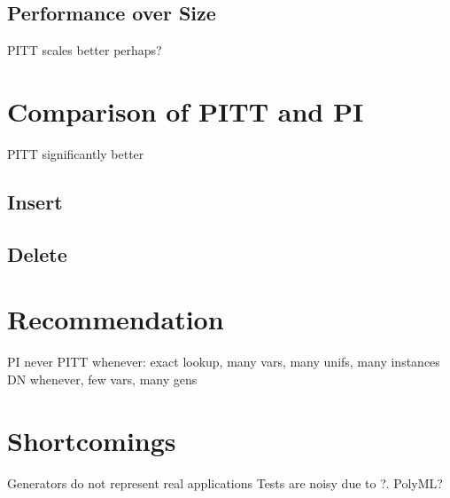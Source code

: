 \subsection{Performance over Size}
PITT scales better perhaps?

\section{Comparison of PITT and PI}
PITT significantly better
\subsection{Insert}
\subsection{Delete}

\section{Recommendation}
PI never
PITT whenever: exact lookup, many vars, many unifs, many instances
DN whenever, few vars, many gens

\section{Shortcomings}
Generators do not represent real applications
Tests are noisy due to ?. PolyML?

